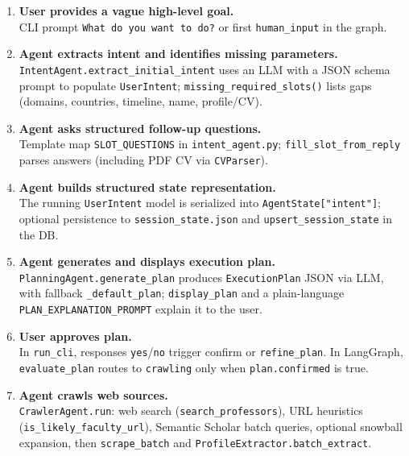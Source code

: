 \documentclass[11pt,a4paper]{article}
\begin{document}
\begin{enumerate}[leftmargin=*]
  \item \textbf{User provides a vague high-level goal.} \\
  CLI prompt \texttt{What do you want to do?} or first \texttt{human\_input} in the graph.

  \item \textbf{Agent extracts intent and identifies missing parameters.} \\
  \texttt{IntentAgent.extract\_initial\_intent} uses an LLM with a JSON schema prompt to populate \texttt{UserIntent}; \texttt{missing\_required\_slots()} lists gaps (domains, countries, timeline, name, profile/CV).

  \item \textbf{Agent asks structured follow-up questions.} \\
  Template map \texttt{SLOT\_QUESTIONS} in \texttt{intent\_agent.py}; \texttt{fill\_slot\_from\_reply} parses answers (including PDF CV via \texttt{CVParser}).

  \item \textbf{Agent builds structured state representation.} \\
  The running \texttt{UserIntent} model is serialized into \texttt{AgentState["intent"]}; optional persistence to \texttt{session\_state.json} and \texttt{upsert\_session\_state} in the DB.

  \item \textbf{Agent generates and displays execution plan.} \\
  \texttt{PlanningAgent.generate\_plan} produces \texttt{ExecutionPlan} JSON via LLM, with fallback \texttt{\_default\_plan}; \texttt{display\_plan} and a plain-language \texttt{PLAN\_EXPLANATION\_PROMPT} explain it to the user.

  \item \textbf{User approves plan.} \\
  In \texttt{run\_cli}, responses \texttt{yes}/\texttt{no} trigger confirm or \texttt{refine\_plan}. In LangGraph, \texttt{evaluate\_plan} routes to \texttt{crawling} only when \texttt{plan.confirmed} is true.

  \item \textbf{Agent crawls web sources.} \\
  \texttt{CrawlerAgent.run}: web search (\texttt{search\_professors}), URL heuristics (\texttt{is\_likely\_faculty\_url}), Semantic Scholar batch queries, optional snowball expansion, then \texttt{scrape\_batch} and \texttt{ProfileExtractor.batch\_extract}.


\end{enumerate}
\end{document}
